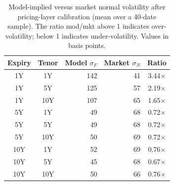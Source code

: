 \begin{table}[H]
\centering
\caption{Model-implied versus market normal volatility after pricing-layer calibration (mean over a 40-date sample). The ratio mod/mkt above 1 indicates over-volatility; below 1 indicates under-volatility. Values in basis points.}
\label{tab:term_structure_trained}
\small
\begin{tabular}{@{}ccrrc@{}}
\toprule
\textbf{Expiry} & \textbf{Tenor} & \textbf{Model \(\sigma_F\)} & \textbf{Market \(\sigma_N\)} & \textbf{Ratio} \\
\midrule
1Y  & 1Y  & 142 & 41 & 3.44$\times$ \\
1Y  & 5Y  & 125 & 57 & 2.19$\times$ \\
1Y  & 10Y  & 107 & 65 & 1.65$\times$ \\
\midrule
5Y  & 1Y  & 49 & 68 & 0.72$\times$ \\
5Y  & 5Y  & 49 & 68 & 0.72$\times$ \\
5Y  & 10Y  & 50 & 69 & 0.72$\times$ \\
\midrule
10Y  & 1Y  & 52 & 69 & 0.76$\times$ \\
10Y  & 5Y  & 45 & 68 & 0.67$\times$ \\
10Y  & 10Y  & 50 & 66 & 0.76$\times$ \\
\bottomrule
\end{tabular}
\end{table}
